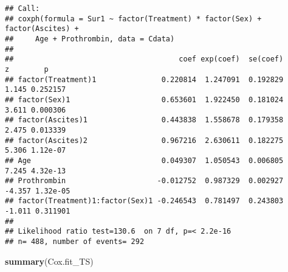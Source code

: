 \documentclass[
]{article}
\newenvironment{Shaded}{\begin{snugshade}}{\end{snugshade}}
\newcommand{\KeywordTok}[1]{\textcolor[rgb]{0.13,0.29,0.53}{\textbf{#1}}}
\newcommand{\NormalTok}[1]{#1}
\begin{document}
\begin{verbatim}
## Call:
## coxph(formula = Sur1 ~ factor(Treatment) * factor(Sex) + factor(Ascites) + 
##     Age + Prothrombin, data = Cdata)
## 
##                                      coef exp(coef)  se(coef)      z        p
## factor(Treatment)1               0.220814  1.247091  0.192829  1.145 0.252157
## factor(Sex)1                     0.653601  1.922450  0.181024  3.611 0.000306
## factor(Ascites)1                 0.443838  1.558678  0.179358  2.475 0.013339
## factor(Ascites)2                 0.967216  2.630611  0.182275  5.306 1.12e-07
## Age                              0.049307  1.050543  0.006805  7.245 4.32e-13
## Prothrombin                     -0.012752  0.987329  0.002927 -4.357 1.32e-05
## factor(Treatment)1:factor(Sex)1 -0.246543  0.781497  0.243803 -1.011 0.311901
## 
## Likelihood ratio test=130.6  on 7 df, p=< 2.2e-16
## n= 488, number of events= 292
\end{verbatim}

\begin{Shaded}
\begin{Highlighting}[]
\KeywordTok{summary}\NormalTok{(Cox.fit_TS)}
\end{Highlighting}
\end{Shaded}
\end{document}

